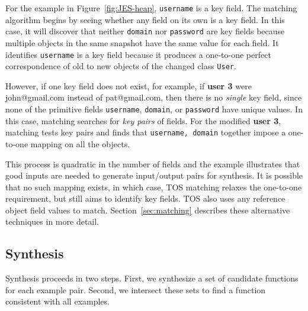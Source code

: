 \documentclass[natbib]{sigplanconf}
\newcommand{\code}[1]{\lstinline|#1|\xspace}
\newcommand{\TOS}{TOS\xspace}
\begin{document}

For the example in Figure~\ref{fig:JES-heap}, \code{username} is a key
field.  The matching algorithm 
begins by seeing whether any field on its own is a key field.  In this
case, it will discover that neither \code{domain} nor \code{password}
are key fields because multiple objects in the same snapshot have the
same value for each field.  It identifies \code{username} is a key
field because it produces a one-to-one perfect correspondence of old
to new objects of the changed class \code{User}.

However, if one key field does not exist, for example, if
\textsf{\textbf{user 3}} were \textsf{john@gmail.com} instead of
\textsf{pat@gmail.com}, then there 
is no \emph{single} key field, since none of the primitive fields
\code{username}, \code{domain}, or \code{password} have unique values.
In this case, matching searches for \emph{key pairs} of fields. For
the modified \textsf{\textbf{user 3}}, matching tests key pairs and finds that
\code{username, domain} together impose a one-to-one mapping on all
the objects.

This process is quadratic in the number of fields and the example
illustrates that good inputs are needed to generate input/output pairs
for synthesis.  It is possible that no such mapping exists, in which
case, \TOS matching relaxes the one-to-one requirement, but still aims to
identify key fields. \TOS also uses any reference object field values
to match.  Section~\ref{sec:matching} describes these alternative
techniques in more detail.

\subsection{Synthesis}

Synthesis proceeds in two steps.  First, we synthesize a set of
candidate functions for each example pair.  Second, we intersect these sets to
find a function consistent with all examples.
\end{document}
